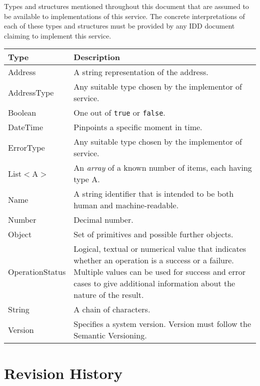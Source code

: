 \documentclass[a4paper]{arrowhead}
\newcommand{\pdef}[1]{{\textcolor{ArrowheadGrey}{#1\label{sec:model:primitives:#1}\label{sec:model:primitives:#1s}\label{sec:model:primitives:#1es}}}}
\begin{document}
Types and structures mentioned throughout this document that are assumed to be available to implementations of this service.
The concrete interpretations of each of these types and structures must be provided by any IDD document claiming to implement this service.


\begin{table}[ht!]
\begin{tabularx}{\textwidth}{| p{3cm} | X |} \hline
\rowcolor{gray!33} Type & Description \\ \hline
\pdef{Address}          & A string representation of the address. \\ \hline
\pdef{AddressType}      & Any suitable type chosen by the implementor of service. \\ \hline
\pdef{Boolean}          & One out of \texttt{true} or \texttt{false}. \\ \hline
\pdef{DateTime}         & Pinpoints a specific moment in time. \\ \hline
\pdef{ErrorType}        & Any suitable type chosen by the implementor of service. \\ \hline
\pdef{List}$<$A$>$      & An \textit{array} of a known number of items, each having type A. \\ \hline
\pdef{Name}             & A string identifier that is intended to be both human and machine-readable. \\ \hline
\pdef{Number}           & Decimal number. \\ \hline
\pdef{Object}           & Set of primitives and possible further objects. \\ \hline
\pdef{OperationStatus}  & Logical, textual or numerical value that indicates whether an operation is a success or a failure. Multiple values can be used for success and error cases to give additional information about the nature of the result. \\ \hline
\pdef{String}           & A chain of characters. \\ \hline
\pdef{Version}          & Specifies a system version. Version must follow the Semantic Versioning. \\ \hline
\end{tabularx}
\end{table}

\newpage




\newpage

\section{Revision History}
\end{document}
